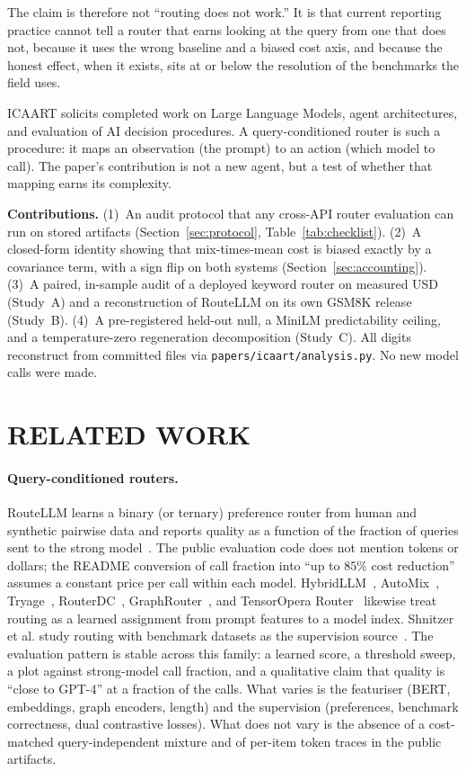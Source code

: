 \documentclass[a4paper,twoside]{article}
\begin{document}
The claim is therefore not ``routing does not work.'' It is that current reporting practice cannot tell a router that earns looking at the query from one that does not, because it uses the wrong baseline and a biased cost axis, and because the honest effect, when it exists, sits at or below the resolution of the benchmarks the field uses.

\noindent ICAART solicits completed work on Large Language Models, agent architectures, and evaluation of AI decision procedures. A query-conditioned router is such a procedure: it maps an observation (the prompt) to an action (which model to call). The paper's contribution is not a new agent, but a test of whether that mapping earns its complexity.

\noindent\textbf{Contributions.}
(1)~An audit protocol that any cross-API router evaluation can run on stored artifacts (Section~\ref{sec:protocol}, Table~\ref{tab:checklist}).
(2)~A closed-form identity showing that mix-times-mean cost is biased exactly by a covariance term, with a sign flip on both systems (Section~\ref{sec:accounting}).
(3)~A paired, in-sample audit of a deployed keyword router on measured USD (Study~A) and a reconstruction of RouteLLM on its own GSM8K release (Study~B).
(4)~A pre-registered held-out null, a MiniLM predictability ceiling, and a temperature-zero regeneration decomposition (Study~C).
All digits reconstruct from committed files via \texttt{papers/icaart/analysis.py}. No new model calls were made.

\section{\uppercase{Related Work}}

\paragraph{Query-conditioned routers.}
RouteLLM learns a binary (or ternary) preference router from human and synthetic pairwise data and reports quality as a function of the fraction of queries sent to the strong model~\cite{ong2025routellm}. The public evaluation code does not mention tokens or dollars; the README conversion of call fraction into ``up to $85\%$ cost reduction'' assumes a constant price per call within each model. HybridLLM~\cite{ding2024hybridllm}, AutoMix~\cite{aggarwal2024automix}, Tryage~\cite{hari2023tryage}, RouterDC~\cite{hu2024routerdc}, GraphRouter~\cite{feng2024graphrouter}, and TensorOpera Router~\cite{stripelis2024tensoropera} likewise treat routing as a learned assignment from prompt features to a model index. Shnitzer et al. study routing with benchmark datasets as the supervision source~\cite{shnitzer2023routing}. The evaluation pattern is stable across this family: a learned score, a threshold sweep, a plot against strong-model call fraction, and a qualitative claim that quality is ``close to GPT-4'' at a fraction of the calls. What varies is the featuriser (BERT, embeddings, graph encoders, length) and the supervision (preferences, benchmark correctness, dual contrastive losses). What does not vary is the absence of a cost-matched query-independent mixture and of per-item token traces in the public artifacts.
\end{document}
